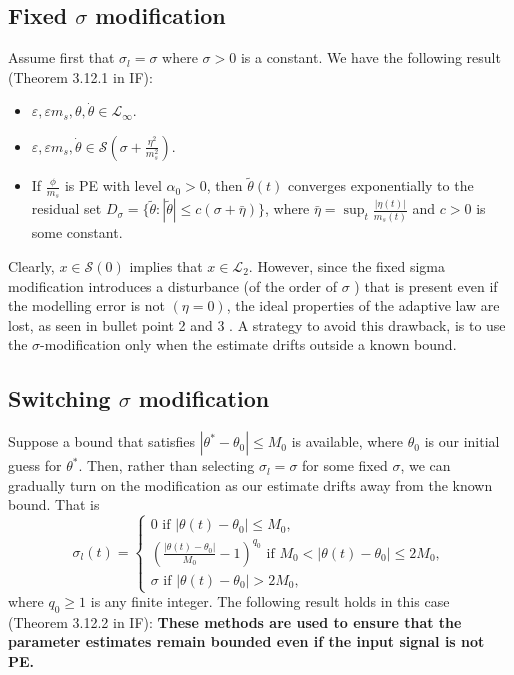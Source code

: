 \documentclass[10pt]{article}
\begin{document}
\begin{multicols*}{2}
\subsection*{Fixed $\sigma $ modification}
Assume first that $\sigma_l=\sigma$ where $\sigma>0$ is a constant. We have the following result (Theorem 3.12.1 in IF):
\begin{itemize}
	\item $\varepsilon, \varepsilon m_s, \theta, \dot{\theta} \in \mathcal{L}_{\infty}$.
	\item $\varepsilon, \varepsilon m_s, \dot{\theta} \in \mathcal{S}\left(\sigma+\frac{\eta^2}{m_s^2}\right)$.
	\item If $\frac{\phi}{m_s}$ is PE with level $\alpha_0>0$, then $\tilde{\theta}(t)$ converges exponentially to the residual set $D_\sigma=\{\tilde{\theta}:|\tilde{\theta}| \leq c(\sigma+\bar{\eta})\}$, where $\bar{\eta}=\sup _t \frac{|\eta(t)|}{m_s(t)}$ and $c>0$ is some constant.
\end{itemize}
Clearly, $x \in \mathcal{S}(0)$ implies that $x \in \mathcal{L}_2$. However, since the fixed sigma modification introduces a disturbance (of the order of $\sigma$ ) that is present even if the modelling error is not $(\eta=0)$, the ideal properties of the adaptive law are lost, as seen in bullet point 2 and 3 . A strategy to avoid this drawback, is to use the $\sigma$-modification only when the estimate drifts outside a known bound.
\subsection*{Switching $\sigma$ modification}
Suppose a bound that satisfies $\left|\theta^*-\theta_0\right| \leq M_0$ is available, where $\theta_0$ is our initial guess for $\theta^*$. Then, rather than selecting $\sigma_l=\sigma$ for some fixed $\sigma$, we can gradually turn on the modification as our estimate drifts away from the known bound. That is
$$
	\sigma_l(t)=\left\{\begin{array}{l}
		0 \text { if }\left|\theta(t)-\theta_0\right| \leq M_0,                                                                       \\
		\left(\frac{\left|\theta(t)-\theta_0\right|}{M_0}-1\right)^{q_0} \text { if } M_0<\left|\theta(t)-\theta_0\right| \leq 2 M_0, \\
		\sigma \text { if }\left|\theta(t)-\theta_0\right|>2 M_0,
	\end{array}\right.
$$
where $q_0 \geq 1$ is any finite integer. The following result holds in this case (Theorem 3.12.2 in IF):
\textbf{These methods are used to ensure that the parameter estimates remain bounded even if the input signal is not PE.}

\end{multicols*}
\end{document}
